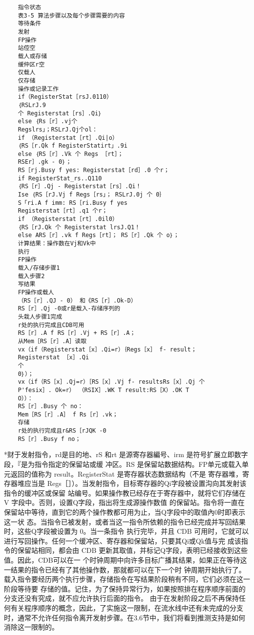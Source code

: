 \begin{verbatim}
    指令状态
    表3-5 算法步骤以及每个步骤需要的内容
    等待条件
    发射
    FP操作
    站倥空
    载人或存储
    缓仲区r空
    仅载人
    仅存储
    操作或记录工作
    if（RegisterStat［rsJ.0110）
    ｛RSLrJ.9
    个 Registerstat［rs］.Qi｝
    else ｛Rs［r］.vj个
    Regslrs」；RSLrJ.Qj个ol：
    if （Registerstat［rt］.Qi|o）
    ｛RS［r.Qk f RegisterStatirt」.9i
    else ｛RS［r］.Vk 个 Regs ［rt］；
    RSEr］.gk - 0｝；
    RS［rj.Busy f yes: Registerstat［rd］.0 个r；
    if RegisterStat_rs..Q110
    ｛RS［r］.Qj - Registerstat［rs］.Qi！
    Ise ｛RS［rJ.Vj f Regs［rs」； RSLrJ.0j 个 0｝
    S「ri.A f imm: RS［ri.Busy f yes
    Registerstat［rt］.q1 个r；
    if （Registerstat［rt］.0il0）
    ｛RS［rJ.Qk 个 Registerstat lrsJ.Q1！
    else ARS［r］.vk f Regs［rt］； RS［r］.Qk 个 o｝；
    计算结果：操作数在Vj和Vk中
    执行
    FP操作
    载入/存储步骤1
    载入步骤2
    写结果
    FP操作或载人
    （RS［r］.QJ - 0） 和《RS［r］.Ok-D）
    RS［r］.Qj -0或r是载入-存储序列的
    头栽人步骤1完成
    r处的执行完成且CDB可用
    RS［r］.A f RS［r］.Vj + RS［r］.A；
    从Mem［RS［r］.A］读取
    vx（if（Registerstat［x］.Qi=r）｛Regs［x］ f- result；
    Registerstat ［x］.Qi
    个
    0｝）；
    vx（if（RS［x］.Qj=r）［RS［x］.Vj f- resultsRs［x］.Qj 个
    P'fesix］. Ok=r） （RSIX］.WK T result:RS［X）.OK T
    O））：
    RS［r］.Busy 个 no：
    Mem［RS［r］.A］ f Rs［r］.vk；
    存储
    r处的执行完成且r&RS［rJQK -0
    RS［r］.Busy f no；
\end{verbatim}
*财于发射指令，rd是目的地、rS 和rt 是源寄存器編号、irm 是符号扩展立即数字段，『是为指令指定的保留站或缓
冲区。RS 是保留站数据结构。FP单元或载入单元返回的值称为 result。RegisterStat 是寄存器状态数据结构（不是
寄存器堆，寄存器堆应当是 Regs［］）。当发射指令，目标寄存器的Qi字段被设置沟向其发射该指令的缓冲区或保留
站编号。如果操作教已经存在于寄存器中，就将它们存储在V 字段中。否则，设置Q字段，指出将生成源操作数值
的保留站。指令将一直在保留站中等待，直到它的两个操作教都可用为止，当Q字段中的取值內0时即表示这一状
态。当指令已被发射，或者当这一指令所依赖的指令已经完成并写回结果时，这些Q字段被设置为 0。当一条指令
执行完毕，并且 CDB 可用时，它就可以进行写回操作。任何一个缓冲区、寄存器和保留站，只要其Qi或Qk值与完
成该指令的保留站相同，都会由 CDB 更新其取值，并标记Q字段，表明已经接收到这些值。因此，CDB可以在一
个时钟周期中向许多目标广播其结果，如果正在等待这一结果的指令已经有了其他操作数，那就都可以在下一个时
钟周期开始执行了。载入指令要经历两个执行步骤，存储指令在写结果阶段稍有不同，它们必须在这一阶段等待要
存储的值。记住，为了保持异常行为，如果按照排在程序顺序前面的分支还没有究成，就不应允许执行后面的指令。
由于在发射阶段之后不再保持任何有关程序顺序的概念，因此，了实施这一限制，在流水线中还有未完成的分支
时，通常不允许任何指令离开发射步骤。在3.6节中，我们将看到推测支持是如何消除这一限制的。
